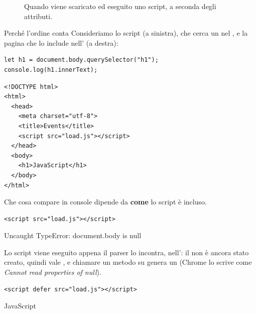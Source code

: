 \begin{figure}[H]
  \caption{Quando viene scaricato ed eseguito uno script, a seconda degli
           attributi.}
  \label{fig:script-order}
\end{figure}

\begin{esempio}{Perché l'ordine conta}
Consideriamo lo script  (a sinistra), che cerca un  nel
, e la pagina che lo include nell' (a destra):

\begin{affianco}[0.45]
\begin{lstlisting}[style=js, name=load.js]
let h1 = document.body.querySelector("h1");
console.log(h1.innerText);
\end{lstlisting}
\risultato
\begin{lstlisting}[style=html, name=pagina.html]
<!DOCTYPE html>
<html>
  <head>
    <meta charset="utf-8">
    <title>Events</title>
    <script src="load.js"></script>
  </head>
  <body>
    <h1>JavaScript</h1>
  </body>
</html>
\end{lstlisting}
\end{affianco}

Che cosa compare in console dipende da \textbf{come} lo script è incluso.

\begin{affianco}[0.45][c]
\begin{lstlisting}[style=html]
<script src="load.js"></script>
\end{lstlisting}
\risultato
\begin{console}
Uncaught TypeError: document.body is null
\end{console}
\end{affianco}

Lo script viene eseguito appena il parser lo incontra, nell': il
 non è ancora stato creato, quindi  vale
, e chiamare un metodo su  genera un 
(Chrome lo scrive come \textit{Cannot read properties of null}).

\begin{affianco}[0.45][c]
\begin{lstlisting}[style=html]
<script defer src="load.js"></script>
\end{lstlisting}
\risultato
\begin{console}
JavaScript
\end{console}
\end{affianco}


\end{esempio}
